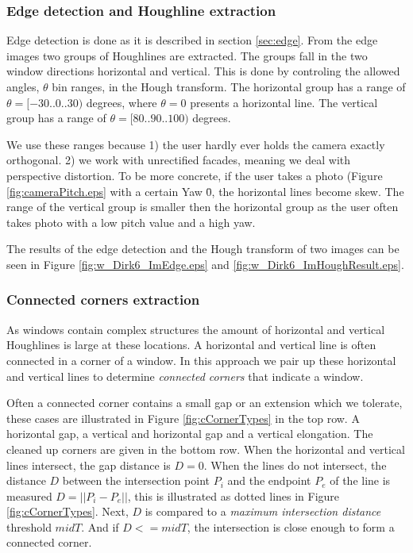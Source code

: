 \subsubsection{Edge detection and Houghline extraction}
Edge detection is done as it is described in section \ref{sec:edge}.
From the edge images two groups of Houghlines are extracted. 
The groups fall in the two window directions horizontal and vertical.
This is done by controling the allowed angles, $\theta$ bin ranges, in the Hough transform.
The horizontal group has a range of $\theta = [-30..0..30)$ degrees, where $\theta = 0$ presents a horizontal line. 
The vertical group has a range of $\theta = [80..90..100)$ degrees. 

We use these ranges because 1) the user hardly ever holds the camera exactly
orthogonal.  2) we work with unrectified facades, meaning we deal with
perspective distortion.  To be more concrete, if the user takes a photo (Figure
\ref{fig:cameraPitch.eps} with a certain Yaw \= 0, the horizontal lines become
skew.  The range of the vertical group is smaller then the horizontal group as
the user often takes photo with a low pitch value and a high yaw.

The results of the edge detection and the Hough transform of two images can be seen in Figure \ref{fig:w_Dirk6_ImEdge.eps} and
 \ref{fig:w_Dirk6_ImHoughResult.eps}.

\subsubsection{Connected corners extraction}
 As windows contain complex structures
the amount of horizontal and vertical Houghlines is large at these locations.
A horizontal and vertical line is often connected in a corner of a window.  In
this approach we pair up these horizontal and vertical lines to determine
\emph{connected corners} that indicate a window.

Often a connected corner contains a small gap or an extension which we tolerate,
these cases are illustrated in Figure \ref{fig:cCornerTypes} in the top row.
A horizontal gap, a vertical and horizontal gap and a vertical elongation. The
cleaned up corners are given in the bottom row.  When the horizontal and
vertical lines intersect, the gap distance is $D=0$.  When the lines do not
intersect, the distance $D$ between the intersection point $P_i$ and the endpoint $P_e$ of the
line is measured $D = ||P_i-P_e||$, this is illustrated as dotted lines in Figure
\ref{fig:cCornerTypes}.  Next, $D$ is compared to a \emph{maximum intersection
distance} threshold $midT$.  And if $D<=midT$, the intersection is close enough
to form a connected corner.\\

